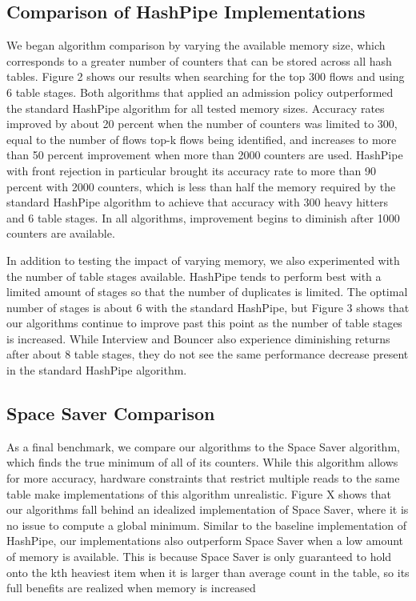 \subsection{Comparison of HashPipe Implementations}
We began algorithm comparison by varying the available memory size, which corresponds to a greater number of counters that can be stored across all hash tables. Figure 2 shows our results when searching for the top 300 flows and using 6 table stages. Both algorithms that applied an admission policy outperformed the standard HashPipe algorithm for all tested memory sizes. Accuracy rates improved by about 20 percent when the number of counters was limited to 300, equal to the number of flows top-k flows being identified, and increases to more than 50 percent improvement when more than 2000 counters are used. HashPipe with front rejection in particular brought its accuracy rate to more than 90 percent with 2000 counters, which is less than half the memory required by the standard HashPipe algorithm to achieve that accuracy with 300 heavy hitters and 6 table stages. In all algorithms, improvement begins to diminish after 1000 counters are available.

In addition to testing the impact of varying memory, we also experimented with the number of table stages available. HashPipe tends to perform best with a limited amount of stages so that the number of duplicates is limited. The optimal number of stages is about 6 with the standard HashPipe, but Figure 3 shows that our algorithms continue to improve past this point as the number of table stages is increased. While Interview and Bouncer also experience diminishing returns after about 8 table stages, they do not see the same performance decrease present in the standard HashPipe algorithm.

\subsection{Space Saver Comparison}
As a final benchmark, we compare our algorithms to the Space Saver algorithm, which finds the true minimum of all of its counters. While this algorithm allows for more accuracy, hardware constraints that restrict multiple reads to the same table make implementations of this algorithm unrealistic. Figure X shows that our algorithms fall behind an idealized implementation of Space Saver, where it is no issue to compute a global minimum. Similar to the baseline implementation of HashPipe, our implementations also outperform Space Saver when a low amount of memory is available. This is because Space Saver is only guaranteed to hold onto the kth heaviest item when it is larger than average count in the table, so its full benefits are realized when memory is increased



